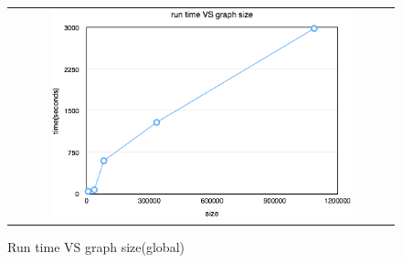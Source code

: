 \begin{figure}[h]
\begin{center}
\begin{tabular}{c}
     \includegraphics[width=0.8\textwidth]{FIG/t7_time.png}
\end{tabular}
\caption{Run time VS graph size(global)}
\label{t7:time}
\end{center}
\end{figure}

